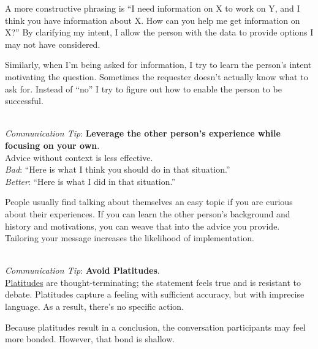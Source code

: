 A more constructive phrasing is ``I need information on X to work on Y, and I think you have information about X. How can you help me get information on X?'' By clarifying my intent, I allow the person with the data to provide options I may not have considered.

Similarly, when I'm being asked for information, I try to learn the person's intent motivating the question. Sometimes the requester doesn't actually know what to ask for. Instead of ``no'' I try to figure out how to enable the person to be successful. 

\ \\
\textit{Communication Tip}: \textbf{Leverage the other person's experience while focusing on your own\label{sec:advice}}.\\
Advice without context is less effective.\\
\textit{Bad}: ``Here is what I think you should do in that situation.''\\
\textit{Better}: ``Here is what I did in that situation.''

People usually find talking about themselves an easy topic if you are curious about their experiences. 
If you can learn the other person's background and history and motivations, you can weave that into the advice you provide. 
Tailoring your message increases the likelihood of implementation. 

\ \\
\textit{Communication Tip}: 
\textbf{Avoid Platitudes\label{sec:platitudes}}.\\
\href{https://en.wikipedia.org/wiki/Platitude}{Platitudes}
are \gls{thought-terminating}; 
\iftoggle{glossaryinmargin}{\marginpar{[Glossary]}}{} the statement feels true and is resistant to debate. Platitudes capture a feeling with sufficient accuracy, but with imprecise language. As a result, there's no specific action.

Because platitudes result in a conclusion, the conversation participants may feel more bonded. However, that bond is shallow.

